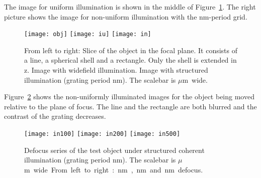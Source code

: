\documentclass[11pt,abstracton,titlepage]{scrartcl}
\newcommand{\figref}[1]{Figure~\ref{#1}}
\begin{document}
The image for uniform illumination is shown in
the middle of \figref{fig:input}. The right picture shows the image
for non-uniform illumination with the \unit[600]{nm}-period grid.

\begin{figure}[htb]
  \centering
  \texttt{[image: obj]}
  \texttt{[image: iu]}
  \texttt{[image: in]}
  \caption{From left to right: Slice of the object in the focal
    plane. It consists of a line, a spherical shell and a
    rectangle. Only the shell is extended in z. Image with widefield
    illumination. Image with structured illumination (grating period
    \unit[600]{nm}). The scalebar is \unit[2]{$\mu$m} wide. }
  \label{fig:input}
\end{figure}

\figref{fig:defocus} shows the non-uniformly illuminated images for
the object being moved relative to the plane of focus. The line and
the rectangle are both blurred and the contrast of the grating
decreases.
\begin{figure}[htb]
  \centering
  \texttt{[image: in100]}
  \texttt{[image: in200]}
  \texttt{[image: in500]}
  \caption{Defocus series of the test object under structured coherent
    illumination (grating period \unit[600]{nm}). The scalebar is
    \unit[2]{$\mu$m} wide. From left to right: \unit[100]{nm},
    \unit[200]{nm} and \unit[500]{nm} defocus.}
  \label{fig:defocus}
\end{figure}





\end{document}
